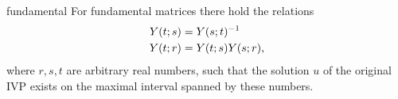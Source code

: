 \begin{Lemma}{fundamental}
  For fundamental matrices there hold the relations
  \begin{align}
    \fundamental(t;s) &= \fundamental(s;t)^{-1}\\
    \label{eq:derivatives:4}
    \fundamental(t;r) &= \fundamental(t;s)\fundamental(s;r),
  \end{align}
  where $r,s,t$ are arbitrary real numbers, such that the solution $u$
  of the original IVP exists on the maximal interval spanned by these
  numbers.
\end{Lemma}

